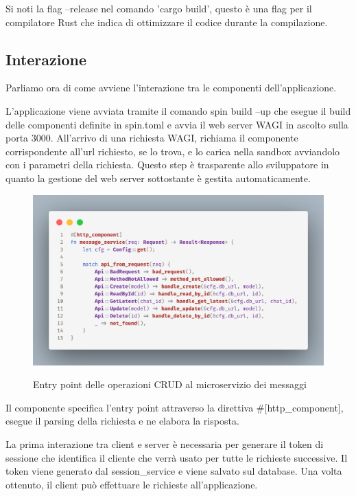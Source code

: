 Si noti la flag --release nel comando 'cargo build', questo è una flag per il compilatore Rust che indica di ottimizzare
il codice durante la compilazione.

\subsection{Interazione}
Parliamo ora di come avviene l'interazione tra le componenti dell'applicazione.

L'applicazione viene avviata tramite il comando spin build --up che esegue il build delle componenti definite in
spin.toml e avvia il web server WAGI in ascolto sulla porta 3000. All'arrivo di una richiesta WAGI, richiama il
componente corrispondente all'url richiesto, se lo trova, e lo carica nella sandbox avviandolo con i parametri della
richiesta. Questo step è trasparente allo sviluppatore in quanto la gestione del web server sottostante è gestita
automaticamente.

\begin{figure}[h]
    \centering
    \captionsetup{justification=centering}
    \includegraphics[width=15cm]{./chapters/3.poc/images/2.microservice_entrypoint.png}
    \label{fig:2.microservice_entrypoint}
    \caption{Entry point delle operazioni CRUD al microservizio dei messaggi}
\end{figure}

Il componente specifica l'entry point attraverso la direttiva \#[http\_component], esegue il parsing della richiesta e
ne elabora la risposta.

La prima interazione tra client e server è necessaria per generare il token di sessione che identifica il cliente che
verrà usato per tutte le richieste successive. Il token viene generato dal session\_service e viene salvato sul
database. Una volta ottenuto, il client può effettuare le richieste all'applicazione.

